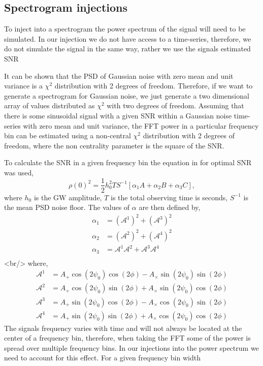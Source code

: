 \subsection{Spectrogram injections}

To inject into a spectrogram the power spectrum of the signal will need to be simulated. In our injection we do not have access to a time-series, therefore, we do not simulate the signal in the same way, rather we use the signals estimated \ac{SNR}

It can be shown that the \ac{PSD} of Gaussian noise with zero mean and unit variance is a $\chi^2$ distribution with 2 degrees of freedom. Therefore, if we want to generate a spectrogram for Gaussian noise, we just generate a two dimensional array of values distributed as $\chi^2$ with two degrees of freedom.
Assuming that there is some sinusoidal signal with a given \ac{SNR} within a Gaussian noise time-series with zero mean and unit variance, the \ac{FFT} power in a particular frequency bin can be estimated using a non-central $\chi^2$ distribution with 2 degrees of freedom, where the non centrality parameter is the square of the \ac{SNR}. 

To calculate the \ac{SNR} in a given frequency bin the equation in \cite{Prix2007} for optimal \ac{SNR} was used,
\begin{equation}
    \rho(0)^2 = \frac{1}{2}h_0^2 T S^{-1} \left[ \alpha_1 A + \alpha_2 B + \alpha_3 C \right],
\end{equation}
where $h_0$ is the \ac{GW} amplitude, $T$ is the total observing time is seconds, $S^{-1}$ is the mean \ac{PSD} noise floor. The values of $\alpha$ are then defined by,
\begin{equation}
\begin{split}
\alpha_1 &= (\mathcal{A}^1)^2 + (\mathcal{A}^3)^2\\
\alpha_2 &= (\mathcal{A}^2)^2 + (\mathcal{A}^4)^2 \\
\alpha_3 &= \mathcal{A}^1\mathcal{A}^2 + \mathcal{A}^3\mathcal{A}^4 \\
\end{split}
\end{equation}
<br/>
where,
\begin{equation}
\begin{split}
\mathcal{A}^1 &= A_{+}\cos(2\psi_0)\cos(2\phi) - A_{\times}\sin(2\psi_0)\sin(2\phi) \\
\mathcal{A}^2 &= A_{+}\cos(2\psi_0)\sin(2\phi) + A_{\times}\sin(2\psi_0)\cos(2\phi) \\
\mathcal{A}^3 &= A_{+}\sin(2\psi_0)\cos(2\phi) - A_{\times}\cos(2\psi_0)\sin(2\phi) \\
\mathcal{A}^4 &= A_{+}\sin(2\psi_0)\sin(2\phi) + A_{\times}\cos(2\psi_0)\cos(2\phi) 
\end{split}
\end{equation}
The signals frequency varies with time and will not always be located at the center of a frequency bin, therefore, when taking the \ac{FFT} some of the power is spread over multiple frequency bins. 
In our injections into the power spectrum we need to account for this effect. 
For a given frequency bin width 
